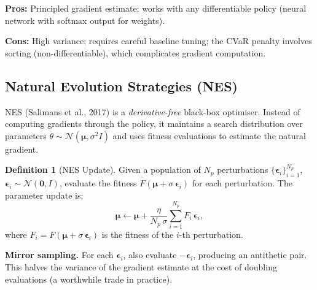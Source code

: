 \documentclass[11pt, a4paper]{article}
\theoremstyle{definition}
\newtheorem{definition}{Definition}[section]
\theoremstyle{plain}
\theoremstyle{remark}
\begin{document}
\textbf{Pros:} Principled gradient estimate; works with any differentiable
policy (neural network with softmax output for weights).

\textbf{Cons:} High variance; requires careful baseline tuning; the CVaR
penalty involves sorting (non-differentiable), which complicates gradient
computation.

\subsection{Natural Evolution Strategies (NES)}

NES (Salimans et al., 2017) is a \emph{derivative-free} black-box
optimiser. Instead of computing gradients through the policy, it
maintains a search distribution over parameters $\theta \sim
\mathcal{N}(\bm{\mu}, \sigma^2 I)$ and uses fitness evaluations to
estimate the natural gradient.

\begin{definition}[NES Update]
\label{def:nes}
Given a population of $N_p$ perturbations
$\{\bm{\epsilon}_i\}_{i=1}^{N_p}$,
$\bm{\epsilon}_i \sim \mathcal{N}(\bm{0}, I)$, evaluate the fitness
$F(\bm{\mu} + \sigma\,\bm{\epsilon}_i)$ for each perturbation. The
parameter update is:
\begin{equation}
    \bm{\mu} \leftarrow \bm{\mu}
    + \frac{\eta}{N_p\,\sigma}
      \sum_{i=1}^{N_p} F_i\,\bm{\epsilon}_i,
    \label{eq:nes_update}
\end{equation}
where $F_i = F(\bm{\mu} + \sigma\,\bm{\epsilon}_i)$ is the fitness of
the $i$-th perturbation.
\end{definition}

\textbf{Mirror sampling.} For each $\bm{\epsilon}_i$, also evaluate
$-\bm{\epsilon}_i$, producing an antithetic pair. This halves the
variance of the gradient estimate at the cost of doubling evaluations
(a worthwhile trade in practice).
\end{document}
